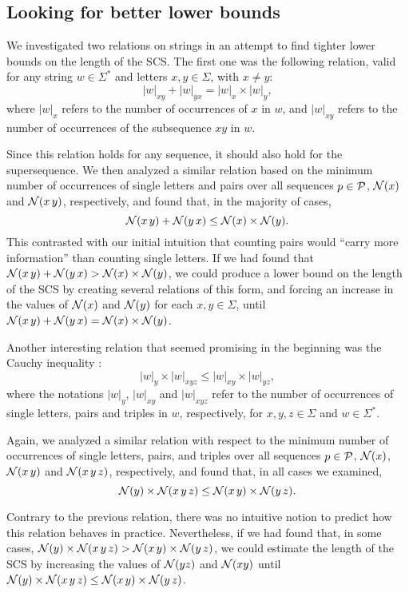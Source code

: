 \subsection{Looking for better lower bounds}

We investigated two relations on strings in an attempt to find tighter lower
bounds on the length of the SCS. The first one was the following relation, valid
for any string $w \in \Sigma^\ast$ and letters $x,y \in \Sigma$, with $x \ne y$:
\[
|w|_{xy} + |w|_{yx} = |w|_{x} \times |w|_{y},
\]
where $|w|_{x}$ refers to the number of occurrences of $x$ in $w$, and
$|w|_{xy}$ refers to the number of occurrences of the subsequence $xy$ in $w$.

Since this relation holds for any sequence, it should also hold for the
supersequence. We then analyzed a similar relation based on the
minimum number of occurrences of single letters and pairs over all sequences
$p \in {\mathcal{P}}$, ${\mathcal{N}}(x)$
and ${\mathcal{N}}(x \, y)$, respectively, and found that, in the majority of cases,
\[
{\mathcal{N}}(x \, y) + {\mathcal{N}}(y \, x) \leq {\mathcal{N}}(x) \times {\mathcal{N}}(y).
\]
This contrasted with our initial intuition that counting pairs would ``carry
more information'' than counting single letters. If we had found that
${\mathcal{N}}(x \, y) + {\mathcal{N}}(y \, x) > {\mathcal{N}}(x) \times {\mathcal{N}}(y)$, we could produce a
lower bound on the length of the SCS by creating several relations of this form,
and forcing an increase in the values of ${\mathcal{N}}(x)$ and ${\mathcal{N}}(y)$ for each
$x,y \in \Sigma$, until
${\mathcal{N}}(x \, y) + {\mathcal{N}}(y \, x) = {\mathcal{N}}(x) \times {\mathcal{N}}(y)$.

Another interesting relation that seemed promising in the beginning was the
Cauchy inequality \citep{Salomaa2003,Mateescu2004}:
\[
|w|_{y} \times |w|_{xyz} \leq |w|_{xy} \times |w|_{yz},
\]
where the notations $|w|_{y}$, $|w|_{xy}$ and $|w|_{xyz}$ refer to the number of
occurrences of single letters, pairs and triples in $w$, respectively, for
$x, y, z \in \Sigma$ and $w \in \Sigma^\ast$.

Again, we analyzed a similar relation with respect to the minimum number of
occurrences of single letters, pairs, and triples over all sequences
$p \in {\mathcal{P}}$, ${\mathcal{N}}(x)$, ${\mathcal{N}}(x \, y)$ and ${\mathcal{N}}(x \, y \, z)$,
respectively, and found that, in all cases we examined,
\[
{\mathcal{N}}(y) \times {\mathcal{N}}(x \, y \, z) \leq {\mathcal{N}}(x \, y) \times {\mathcal{N}}(y \,z).
\]

Contrary to the previous relation, there was no intuitive notion to predict how
this relation behaves in practice. Nevertheless, if we had found that, in some
cases, ${\mathcal{N}}(y) \times {\mathcal{N}}(x \, y \, z) > {\mathcal{N}}(x \, y) \times {\mathcal{N}}(y \,z)$,
we could estimate the length of the SCS by increasing the values of ${\mathcal{N}}(yz)$
and ${\mathcal{N}}(xy)$ until
${\mathcal{N}}(y) \times {\mathcal{N}}(x \, y \, z) \leq {\mathcal{N}}(x \, y) \times {\mathcal{N}}(y \,z)$.

